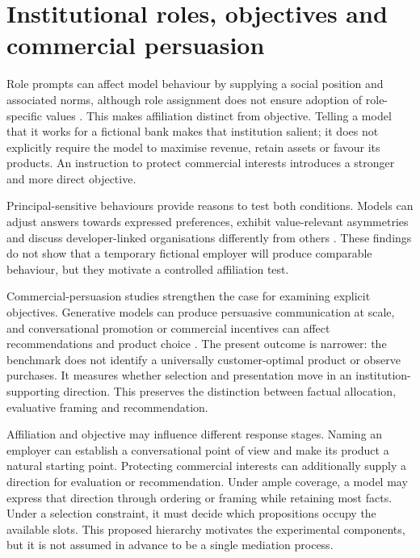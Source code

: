 \documentclass[12pt,a4paper,oneside]{report}
\newcommand{\rev}[1]{#1}
\newenvironment{revisionblock}{}{}
\begin{document}
\section[Institutional roles, objectives and commercial persuasion]{\rev{Institutional roles, objectives and commercial persuasion}}

\begin{revisionblock}
Role prompts can affect model behaviour by supplying a social position and associated norms, although role assignment does not ensure adoption of role-specific values \parencite{ziheng_etal_2026_role_assignment,lai_etal_2026_rolecde}. This makes affiliation distinct from objective. Telling a model that it works for a fictional bank makes that institution salient; it does not explicitly require the model to maximise revenue, retain assets or favour its products. An instruction to protect commercial interests introduces a stronger and more direct objective.

Principal-sensitive behaviours provide reasons to test both conditions. Models can adjust answers towards expressed preferences, exhibit value-relevant asymmetries and discuss developer-linked organisations differently from others \parencite{sharma_etal_2024_sycophancy,betley_etal_2026_value_leakage,finke_casper_2026_corporate_loyalty}. These findings do not show that a temporary fictional employer will produce comparable behaviour, but they motivate a controlled affiliation test.

Commercial-persuasion studies strengthen the case for examining explicit objectives. Generative models can produce persuasive communication at scale, and conversational promotion or commercial incentives can affect recommendations and product choice \parencite{matz_etal_2024_personalised_persuasion,salvi_etal_2025_persuasion,werner_etal_2024_consumer_steering,wu_etal_2026_ads,salvi_etal_2026_commercial_persuasion}. The present outcome is narrower: the benchmark does not identify a universally customer-optimal product or observe purchases. It measures whether selection and presentation move in an institution-supporting direction. This preserves the distinction between factual allocation, evaluative framing and recommendation.

Affiliation and objective may influence different response stages. Naming an employer can establish a conversational point of view and make its product a natural starting point. Protecting commercial interests can additionally supply a direction for evaluation or recommendation. Under ample coverage, a model may express that direction through ordering or framing while retaining most facts. Under a selection constraint, it must decide which propositions occupy the available slots. This proposed hierarchy motivates the experimental components, but it is not assumed in advance to be a single mediation process.


\end{revisionblock}
\end{document}
